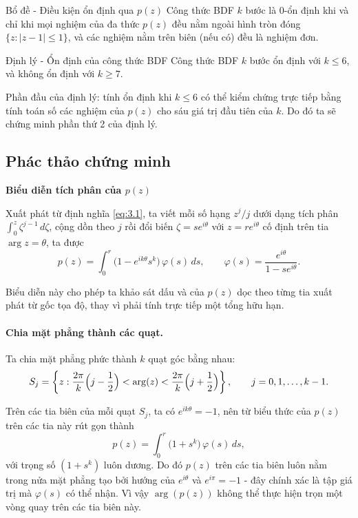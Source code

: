 \begin{baitapbox}{Bổ đề - Điều kiện ổn định qua $p(z)$}
Công thức BDF $k$ bước là 0-ổn định khi và chỉ khi mọi nghiệm của đa thức
$p(z)$ đều nằm ngoài hình tròn đóng $\{z : |z-1|\le 1\}$, và các nghiệm nằm trên biên (nếu có) đều là nghiệm đơn.
\end{baitapbox}

\begin{baitapbox}{Định lý - Ổn định của công thức BDF}
    Công thức BDF $k$ bước ổn định với $k \le 6$, và không ổn định với $k \ge 7$.
\end{baitapbox}

Phần đầu của định lý: tính ổn định khi $k\le 6$  có thể kiểm chứng trực
tiếp bằng tính toán số các nghiệm của $p(z)$ cho sáu giá trị đầu tiên của
$k$. Do đó ta sẽ chứng minh phần thứ 2 của định lý.
\subsection*{Phác thảo chứng minh}
\noindent\textbf{Biểu diễn tích phân của $p(z)$}
 
Xuất phát từ định nghĩa \eqref{eq:3.1}, ta viết mỗi số hạng $z^{j}/j$
dưới dạng tích phân $\int_0^z \zeta^{j-1}\,d\zeta$, cộng dồn theo $j$ rồi
đổi biến $\zeta = se^{i\theta}$ với $z = re^{i\theta}$ cố định trên tia
$\arg z=\theta$, ta được
\begin{equation*}
p(z) = \int_0^{r} \bigl(1 - e^{ik\theta} s^{k}\bigr)\,\varphi(s)\, ds,
\qquad
\varphi(s) = \frac{e^{i\theta}}{1 - se^{i\theta}}.
\label{eq:bdf-p-integral}
\end{equation*}
 
Biểu diễn này cho phép ta khảo sát dấu và  của $p(z)$ dọc theo từng tia xuất phát từ gốc tọa độ, thay vì phải tính trực tiếp một tổng hữu hạn.
 
\paragraph{Chia mặt phẳng thành các quạt.} Ta chia mặt phẳng phức thành
$k$ quạt góc bằng nhau:
\[
S_j = \left\{ z : \frac{2\pi}{k}\Bigl(j-\frac12\Bigr) < \arg(z) < \frac{2\pi}{k}\Bigl(j+\frac12\Bigr) \right\},
\qquad j = 0, 1, \dots, k-1.
\]
 
Trên các tia biên của mỗi quạt $S_j$, ta có $e^{ik\theta} = -1$, nên từ biểu thức của $p(z)$ trên các tia này rút gọn
thành
\[
p(z) = \int_0^{r} \bigl(1 + s^{k}\bigr)\,\varphi(s)\, ds,
\]
với trọng số $(1+s^k)$ luôn dương. Do đó $p(z)$ trên các tia biên luôn nằm trong nửa mặt phẳng tạo bởi hướng của $e^{i\theta}$ và $e^{i\pi} = -1$ - đây chính xác là tập giá trị mà $\varphi(s)$ có thể nhận. Vì vậy
$\arg(p(z))$ không thể thực hiện trọn một vòng quay trên các tia biên này.
 
